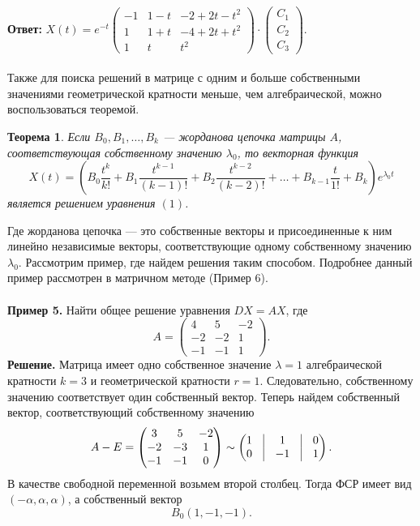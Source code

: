 \documentclass[a4paper, 12pt]{article}
\newtheorem*{theorem}{Теорема}
\begin{document}
\textbf{Ответ:} $X(t) = e^{-t}\begin{pmatrix}
	-1 & 1-t & -2+2t-t^2\\
	1& 1+t & -4 + 2t + t^2\\
	1 & t & t^2
\end{pmatrix} \cdot \begin{pmatrix}
	C_1\\C_2\\C_3
\end{pmatrix}.$\\\\
Также для поиска решений в матрице с одним и больше собственными значениями геометрической кратности меньше, чем алгебраической, можно воспользоваться теоремой.
\begin{theorem}
	Если $B_0, B_1, \ldots, B_k$ --- жорданова цепочка матрицы $A$, соответствующая собственному значению $\lambda_0$, то векторная функция $$X(t) = (B_0\dfrac{t^k}{k!} + B_1\dfrac{t^{k-1}}{(k-1)!} + B_2\dfrac{t^{k-2}}{(k-2)!} + \ldots + B_{k-1}\dfrac{t}{1!} + B_k)e^{\lambda_0 t}$$ является решением уравнения $(1)$. 
\end{theorem}
Где жорданова цепочка --- это собственные векторы и присоединенные к ним линейно независимые векторы, соответствующие одному собственному значению $\lambda_0$. Рассмотрим пример, где найдем решения таким способом. Подробнее данный пример рассмотрен в матричном методе (Пример 6).\\\\
\textbf{Пример 5.} Найти общее решение уравнения $DX = AX$, где $$A = \begin{pmatrix}
	4 & 5 & -2\\
	-2 & -2 & 1\\
	-1 & -1 & 1
\end{pmatrix}.$$
\textbf{Решение.} Матрица имеет одно собственное значение $\lambda = 1$ алгебраической кратности $k = 3$ и геометрической кратности $r = 1$. Следовательно, собственному значению соответствует один собственный вектор.
Теперь найдем собственный вектор, соответствующий собственному значению $$A - E = \begin{pmatrix}
	3 & 5 & -2\\
	-2 & -3 & 1\\
	-1 & -1 & 0
\end{pmatrix}\sim \begin{pmatrix}
	1 & \vline & 1 & \vline & 0\\
	0 & \vline & -1 &\vline & 1
\end{pmatrix}.$$
В качестве свободной переменной возьмем второй столбец. Тогда ФСР имеет вид $(-\alpha, \alpha, \alpha)$, а собственный вектор $$B_0(1, -1, -1).$$
\end{document}
